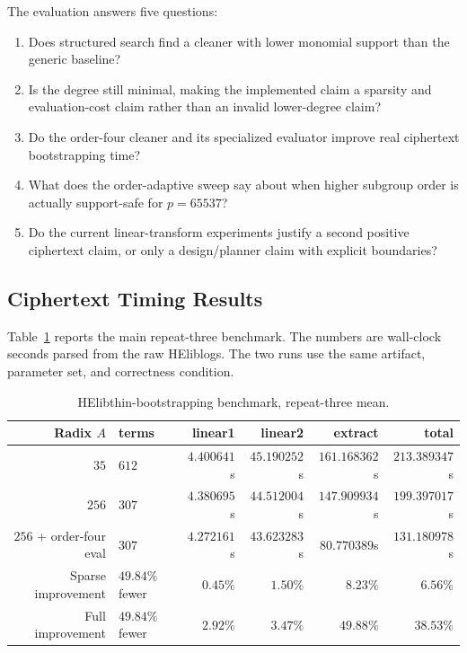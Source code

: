 \documentclass[a4paper,runningheads]{llncs}
\newcommand{\HElib}{\textsf{HElib}}
\begin{document}
The evaluation answers five questions:
\begin{enumerate}[leftmargin=*]
  \item Does structured search find a cleaner with lower monomial support than
  the generic baseline?
  \item Is the degree still minimal, making the implemented claim a sparsity
  and evaluation-cost claim rather than an invalid lower-degree claim?
  \item Do the order-four cleaner and its specialized evaluator improve real
  ciphertext bootstrapping time?
  \item What does the order-adaptive sweep say about when higher subgroup order
  is actually support-safe for $p=65537$?
  \item Do the current linear-transform experiments justify a second positive
  ciphertext claim, or only a design/planner claim with explicit boundaries?
\end{enumerate}

\subsection{Ciphertext Timing Results}

Table~\ref{tab:helib_repeat3} reports the main repeat-three benchmark.  The
numbers are wall-clock seconds parsed from the raw \HElib logs.  The two runs
use the same artifact, parameter set, and correctness condition.

\begin{table}[t]
\centering
\caption{\HElib thin-bootstrapping benchmark, repeat-three mean.}
\label{tab:helib_repeat3}
\begin{tabular}{rlrrrr}
\toprule
\textbf{Radix $A$} & \textbf{terms} & \textbf{linear1} &
\textbf{linear2} & \textbf{extract} & \textbf{total} \\
\midrule
$35$ & $612$ & $4.400641$s & $45.190252$s &
$161.168362$s & $213.389347$s \\
$256$ & $307$ & $4.380695$s & $44.512004$s &
$147.909934$s & $199.397017$s \\
$256$ + order-four eval & $307$ & $4.272161$s & $43.623283$s &
$80.770389$s & $131.180978$s \\
\midrule
Sparse improvement & $49.84\%$ fewer & $0.45\%$ & $1.50\%$ &
$8.23\%$ & $6.56\%$ \\
Full improvement & $49.84\%$ fewer & $2.92\%$ & $3.47\%$ &
$49.88\%$ & $38.53\%$ \\
\bottomrule
\end{tabular}
\end{table}
\end{document}
